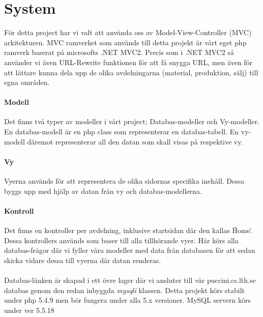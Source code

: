 \section{System}

För detta project har vi valt att använda oss av Model-View-Controller (MVC) arkitekturen.
MVC ramverket som används till detta projekt är vårt eget php ramverk baserat på microsofts .NET MVC2.
Precis som i .NET MVC2 så använder vi även URL-Rewrite funktionen för att få snygga URL, men även för att lättare kunna dela upp de olika avdelningarna (material, produktion, sälj) till egna områden.

\paragraph{Modell}
Det finns två typer av modeller i vårt project; Databas-modeller och Vy-modeller.
En databas-modell är en php class som representerar en databas-tabell.
En vy-modell däremot representerar all den datan som skall visas på respektive vy.

\paragraph{Vy}
Vyerna används för att representera de olika sidornas specifika inehåll. Dessa byggs upp med hjälp av datan från vy och databas-modellerna.

\paragraph{Kontroll}
Det finns en kontroller per avdelning, inklusive startsidan där den kallas \"Home\". Dessa kontrollers används som baser till alla tillhörande vyer.
Här körs alla databas-frågor där vi fyller våra modeller med data från databasen för att sedan skicka vidare dessa till vyerna där datan renderas.\\
\\
Databas-länken är skapad i ett övre lager där vi ansluter till vår puccini.cs.lth.se databas genom den redan inbyggda \textit{mysqli} klassen.
Detta projekt körs stabilt under php 5.4.9 men bör fungera under alla 5.x versioner.
MySQL servern körs under ver 5.5.18
